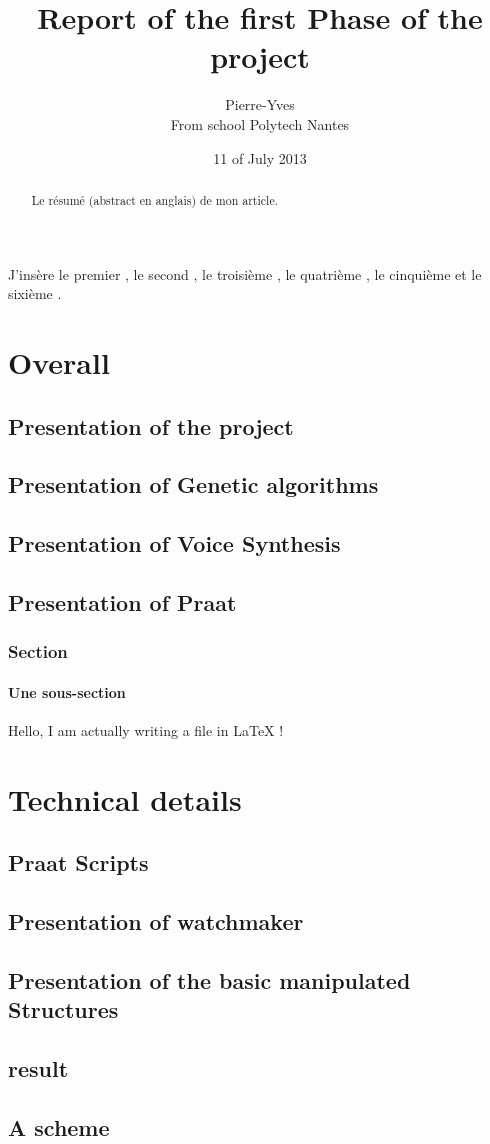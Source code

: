 \documentclass{report}
\title{Report of the first Phase of the project}
\author{Pierre-Yves \bsc{Hervo} \\From school Polytech Nantes}
\date{11\up{th} of July 2013}
\begin{document}
\maketitle

\begin{abstract}
Le résumé (abstract en anglais) de mon article.
\end{abstract}
  
\tableofcontents

J'insère le premier \cite{ref}, le second \cite{ref2}, le troisième \cite{ref3}, le quatrième \cite{ref4}, le cinquième \cite{ref5} et le sixième \cite{ref6}.


\part{Overall}
\chapter{Presentation of the project}
\chapter{Presentation of Genetic algorithms}
\chapter{Presentation of Voice Synthesis}
\chapter{Presentation of Praat}
\section{Section}
\subsection{Une sous-section}
Hello, I am actually writing a file in LaTeX !
\part{Technical details}
\chapter{Praat Scripts}
\chapter{Presentation of watchmaker}
\chapter{Presentation of the basic manipulated Structures}
\chapter{result}
\appendix
\chapter{A scheme}

\listoffigures
\listoftables

 
\end{document}
